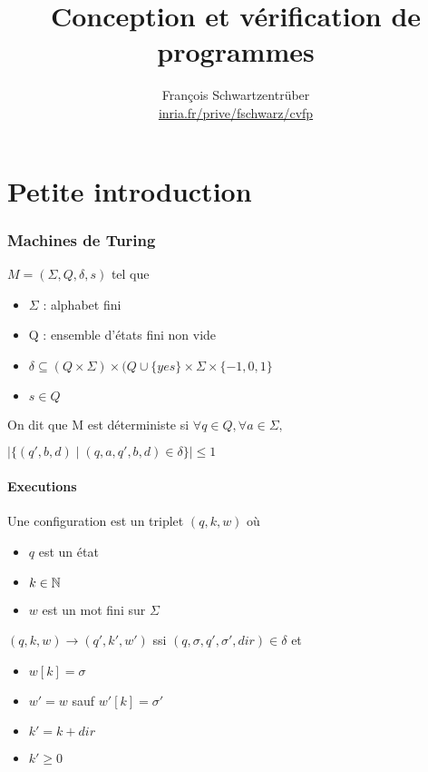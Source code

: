 \documentclass[10pt,a4paper]{article}
\title{Conception et vérification de programmes}
\author{François Schwartzentrüber\\
\url{inria.fr/prive/fschwarz/cvfp}}
\date{}
\begin{document}
\renewcommand{\labelitemi}{$\bullet$}

\maketitle

\part{Petite introduction}

\section{Machines de Turing}

\begin{definition} $M = ( \Sigma , Q , \delta, s)$ tel que \begin{itemize}
\item $\Sigma$ : alphabet fini
\item Q : ensemble d'états fini non vide
\item $\delta \subseteq (Q \times \Sigma) \times (Q \cup \{yes \} \times \Sigma \times \{-1, 0, 1\}$
\item $s \in Q$
\end{itemize}
On dit que M est déterministe si $\forall q \in Q, \forall a \in \Sigma,$

$\mid \{ (q', b, d) \mid (q, a, q', b, d) \in \delta \} \mid \leq 1$
\end{definition}

\subsection{Executions}
\begin{definition}[Configuration]
Une configuration est un triplet $(q, k, w)$ où \begin{itemize}
\item $q$ est un état
\item $k \in \mathbb{N}$
\item $w$ est un mot fini sur $\Sigma$
\end{itemize}
\end{definition}

\begin{definition}[Transition]
$(q, k, w) \rightarrow (q', k', w')$ ssi $(q, \sigma, q', \sigma', dir) \in \delta$ et \begin{itemize}
\item $w[k] = \sigma$
\item $w' = w$ sauf $w'[k] = \sigma'$
\item $k' = k + dir$
\item $k' \geq 0$
\end{itemize}\end{definition}
\end{document}
